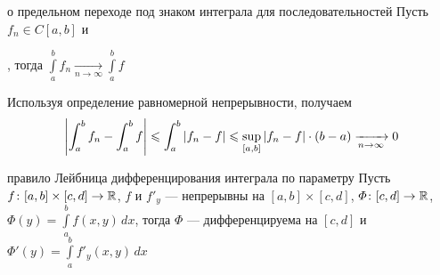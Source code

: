 \begin{teor}[https://www.youtube.com/live/Ebv-BznzM6k?si=RuXzZttXQEEHu5uP&t=9695]{о предельном переходе под знаком интеграла для последовательностей}\label{пер.под инт.}
	Пусть $f_n \in C[a, b]$  и\!, тогда $\int\limits_a^b f_n \xrightarrow[n \to \infty]{} \int\limits_a^b f$
\end{teor} %

\begin{prf} %
	Используя определение равномерной непрерывности, получаем
	\[\left| \int_a^b f_n - \int_a^b f \right| \leqslant \int_a^b |f_n - f| \leqslant \sup_{[a, b]} |f_n - f| \cdot (b - a) \xrightarrow[n \to \infty]{} 0\]
\end{prf} %

\begin{teor}[https://www.youtube.com/live/Ebv-BznzM6k?si=iFyP1BR_34MXd5Q_&t=9897]{правило Лейбница дифференцирования интеграла по параметру}\label{пр.лейб.}
	Пусть $f \colon [a, b] \times [c, d] \to \mathbb R$, $f$ и $f'_y$ --- непрерывны на $[a, b] \times [c, d]$, $\varPhi \colon [c, d] \to \mathbb R$, $\varPhi(y) = \int\limits_a^bf(x, y) \, dx$, тогда $\varPhi$ --- дифференцируема на $[c, d]$ и $\varPhi '(y) = \int\limits_a^b f'_y(x, y)\,dx$ 
\end{teor} %

